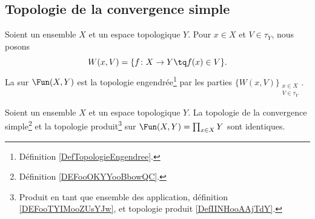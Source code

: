 \subsection{Topologie de la convergence simple}

\begin{definition}	\label{DEFooOKYYooBbowQC}
	Soient un ensemble \( X\) et un espace topologique \( Y\). Pour \( x\in X\) et \( V\in\tau_Y\), nous posons
	\begin{equation}
		W(x,V)=\{f \colon X\to Y\tq f(x)\in V   \}.
	\end{equation}
	La  sur \( \Fun(X,Y)\) est la topologie engendrée\footnote{Définition \ref{DefTopologieEngendree}.} par les parties \( \{ W(x,V) \}_{\substack{ x\in X \\ V\in\tau_Y }  }\).
\end{definition}

\begin{proposition}	\label{PROPooWLWYooBWCajp}
	Soient un ensemble \( X\) et un espace topologique \( Y\). La topologie de la convergence simple\footnote{Définition \ref{DEFooOKYYooBbowQC}.} et la topologie produit\footnote{Produit en tant que ensemble des application, définition \ref{DEFooTYIMooZUsYJw}, et topologie produit \ref{DefIINHooAAjTdY}.} sur \( \Fun(X,Y)=\prod_{x\in X}Y\) sont identiques.
\end{proposition}

